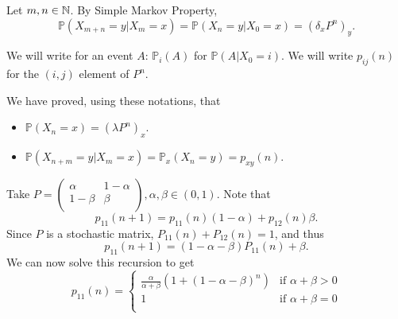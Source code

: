 \documentclass[a4paper]{article}
\begin{document}
Let $m,n\in {\mathbb{N}}$. By Simple Markov Property, 
\[
    \mathbb{P}(X_{m+n}=y|X_m=x)=\mathbb{P}(X_n=y|X_0=x)=(\delta_x P^n)_y.
\]
\begin{notation}
    We will write for an event $A$: $ \mathbb{P}_i(A) $ for $ \mathbb{P}(A|X_0=i) $. We will write $ p_{ij}(n) $ for the $(i,j)$ element of $P^n$.
\end{notation}
We have proved, using these notations, that 
\begin{theorem}
    \begin{itemize}
        \item $ \mathbb{P}(X_n=x)=(\lambda P^n)_x $.
        \item $ \mathbb{P}(X_{n+m}=y|X_m=x)=\mathbb{P}_x(X_n=y)=p_{xy}(n) $.
    \end{itemize}
\end{theorem}
\begin{example}
    Take $ P = \begin{pmatrix}
        \alpha & 1-\alpha \\
        1-\beta & \beta \\
    \end{pmatrix}, \alpha,\beta\in (0,1). $
    Note that 
    \[
        p_{11}(n+1) = p_{11}(n)(1-\alpha)+p_{12}(n)\beta.
    \]
    Since $P$ is a stochastic matrix, $P_{11}(n)+P_{12}(n)=1 $, and thus 
    \[
        p_{11}(n+1)=(1-\alpha-\beta)P_{11}(n)+\beta.
    \]
    We can now solve this recursion to get 
    \[
        p_{11}(n)=\begin{cases}
        \frac{\alpha}{\alpha+\beta}\left( 1+(1-\alpha-\beta)^n \right) &\text{if }\alpha+\beta>0\\
        1 &\text{if }\alpha+\beta=0\\
        \end{cases} 
    \]
\end{example}
\end{document}
